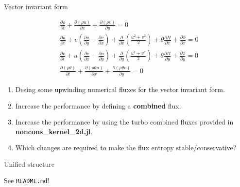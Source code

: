 \documentclass[handout,t,fleqn,leqno,aspectratio=1610,10pt]{beamer}
\begin{document}
\begin{frame}{Vector invariant form}

\begin{equation*}
  \begin{aligned}
&\frac{\partial \rho}{\partial t}
+ \frac{\partial (\rho u)}{\partial x}
+ \frac{\partial (\rho v)}{\partial y}
=0\\
&\frac{\partial u}{\partial t}
+ v\left(\frac{\partial u}{\partial y}-\frac{\partial v}{\partial x}\right)
+ \frac{\partial}{\partial x}\left(\frac{u^2+v^2}{2}\right)
+ \theta \frac{\partial \Pi}{\partial x}
+ \frac{\partial \phi}{\partial x}
=0\\
&\frac{\partial v}{\partial t}
+ u\left(\frac{\partial v}{\partial x}-\frac{\partial u}{\partial y}\right)
+ \frac{\partial}{\partial y}\left(\frac{u^2+v^2}{2}\right)
+ \theta \frac{\partial \Pi}{\partial y}
+ \frac{\partial \phi}{\partial y}
=0\\
&\frac{\partial (\rho\theta)}{\partial t}
+ \frac{\partial (\rho\theta u)}{\partial x}
+ \frac{\partial (\rho\theta v)}{\partial y}
=0
  \end{aligned}
\end{equation*}

\begin{enumerate}
\item[\textbullet] Desing some upwinding numerical fluxes for the vector invariant form. 
\item[\textbullet] Increase the performance by defining a \textbf{combined} flux.
\item[\textbullet] Increase the performance by using the turbo combined fluxes provided in \textbf{noncons\_kernel\_2d.jl}.
\item[\textbullet] Which changes are required to make the flux entropy stable/conservative? 
\end{enumerate}

\end{frame}


\begin{frame}{Unified structure}

See \texttt{README.md}!

\end{frame}


%
%
\end{document}
